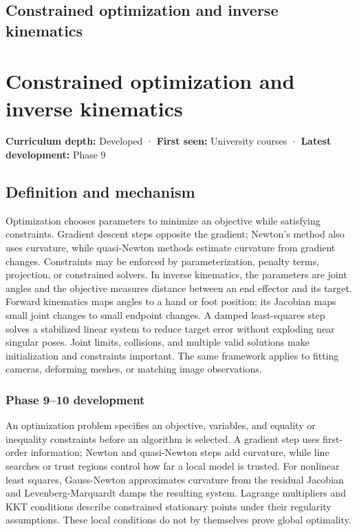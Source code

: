 \hypertarget{appendix-29f4bea4c2bb}{}
\section*{Constrained optimization and inverse kinematics}
\chapter{Constrained optimization and inverse kinematics}\label{appendix-29f4bea4c2bb-constrained-optimization-and-inverse-kinematics}

\textbf{Curriculum depth:} Developed · \textbf{First seen:} University courses · \textbf{Latest development:} Phase 9

\section{Definition and mechanism}\label{appendix-29f4bea4c2bb-definition-and-mechanism}

Optimization chooses parameters to minimize an objective while satisfying constraints. Gradient descent steps opposite the gradient; Newton's method also uses curvature, while quasi-Newton methods estimate curvature from gradient changes. Constraints may be enforced by parameterization, penalty terms, projection, or constrained solvers. In inverse kinematics, the parameters are joint angles and the objective measures distance between an end effector and its target. Forward kinematics maps angles to a hand or foot position; its Jacobian maps small joint changes to small endpoint changes. A damped least-squares step solves a stabilized linear system to reduce target error without exploding near singular poses. Joint limits, collisions, and multiple valid solutions make initialization and constraints important. The same framework applies to fitting cameras, deforming meshes, or matching image observations.

\subsection{Phase 9--10 development}\label{appendix-29f4bea4c2bb-phase-910-development}

An optimization problem specifies an objective, variables, and equality or inequality constraints before an algorithm is selected. A gradient step uses first-order information; Newton and quasi-Newton steps add curvature, while line searches or trust regions control how far a local model is trusted. For nonlinear least squares, Gauss-Newton approximates curvature from the residual Jacobian and Levenberg-Marquardt damps the resulting system. Lagrange multipliers and KKT conditions describe constrained stationary points under their regularity assumptions. These local conditions do not by themselves prove global optimality.

